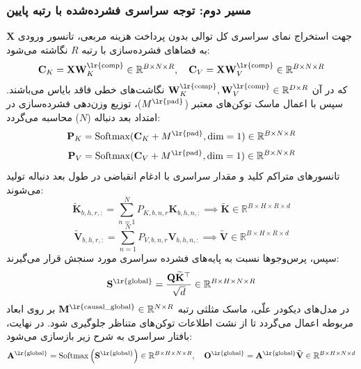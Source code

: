 \subsubsection*{مسیر دوم: توجه سراسری فشرده‌شده با رتبه پایین }
جهت استخراج نمای سراسری کل توالی بدون پرداخت هزینه مربعی، تانسور ورودی $\mathbf{X}$ به فضاهای فشرده‌سازی با رتبه $R$ نگاشته می‌شود:
\begin{equation}
\mathbf{C}_K = \mathbf{X} \mathbf{W}_K^{\text{\lr{comp}}} \in \mathbb{R}^{B \times N \times R}, \quad \mathbf{C}_V = \mathbf{X} \mathbf{W}_V^{\text{\lr{comp}}} \in \mathbb{R}^{B \times N \times R}
\end{equation}
که در آن $\mathbf{W}_K^{\text{\lr{comp}}}, \mathbf{W}_V^{\text{\lr{comp}}} \in \mathbb{R}^{D \times R}$ نگاشت‌های خطی فاقد بایاس می‌باشند. سپس با اعمال ماسک توکن‌های معتبر ($M^{\text{\lr{pad}}}$)، توزیع وزن‌دهی فشرده‌سازی در امتداد بعد دنباله ($N$) محاسبه می‌گردد:
\begin{equation}
\mathbf{P}_K = \operatorname{Softmax}(\mathbf{C}_K + M^{\text{\lr{pad}}}, \operatorname{dim}=1) \in \mathbb{R}^{B \times N \times R}
\end{equation}
\begin{equation}
\mathbf{P}_V = \operatorname{Softmax}(\mathbf{C}_V + M^{\text{\lr{pad}}}, \operatorname{dim}=1) \in \mathbb{R}^{B \times N \times R}
\end{equation}
تانسورهای متراکم کلید و مقدار سراسری با ادغام انقباضی در طول بعد دنباله تولید می‌شوند:
\begin{equation}
\widetilde{\mathbf{K}}_{b, h, r, :} = \sum_{n=1}^N P_{K, b, n, r} \mathbf{K}_{b, h, n, :} \implies \widetilde{\mathbf{K}} \in \mathbb{R}^{B \times H \times R \times d}
\end{equation}
\begin{equation}
\widetilde{\mathbf{V}}_{b, h, r, :} = \sum_{n=1}^N P_{V, b, n, r} \mathbf{V}_{b, h, n, :} \implies \widetilde{\mathbf{V}} \in \mathbb{R}^{B \times H \times R \times d}
\end{equation}
سپس، پرس‌وجوها نسبت به پایه‌های فشرده سراسری مورد سنجش قرار می‌گیرند:
\begin{equation}
\mathbf{S}^{\text{\lr{global}}} = \frac{\mathbf{Q} \widetilde{\mathbf{K}}^\top}{\sqrt{d}} \in \mathbb{R}^{B \times H \times N \times R}
\end{equation}
در مدل‌های دیکودر علّی، ماسک مثلثی رتبه $\mathbf{M}^{\text{\lr{causal\_global}}} \in \mathbb{R}^{N \times R}$ بر روی ابعاد مربوطه اعمال می‌گردد تا از نشت اطلاعات توکن‌های متناظر جلوگیری شود. در نهایت، بافتار سراسری به شرح زیر بازسازی می‌شود:
\begin{equation}
\mathbf{A}^{\text{\lr{global}}} = \operatorname{Softmax}\left( \mathbf{S}^{\text{\lr{global}}} \right) \in \mathbb{R}^{B \times H \times N \times R}, \quad \mathbf{O}^{\text{\lr{global}}} = \mathbf{A}^{\text{\lr{global}}} \widetilde{\mathbf{V}} \in \mathbb{R}^{B \times H \times N \times d}
\end{equation}

